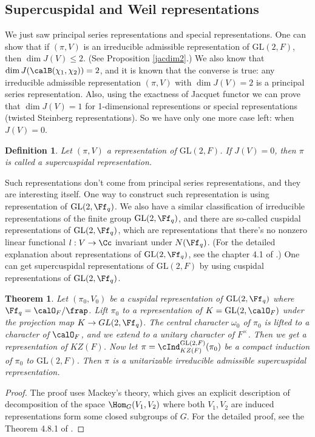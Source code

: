 \documentclass{article}
\newtheorem{theorem}{Theorem}[section]
\newtheorem{definition}{Definition}[section]
\newcommand{\GL}{\mathrm{GL}}
\begin{document}
\subsection{Supercuspidal and Weil representations}
We just saw principal series representations and special representations. One can show that if $(\pi, V)$  is an irreducible admissible representation of $\GL(2, F)$, then $\dim J(V) \leq 2$. (See Proposition \ref{jacdim2}.) 
We also know that $\dim J(\calB(\chi_1, \chi_2)) = 2$, and it is known that the converse is true: any irreducible admissible representation $(\pi, V)$ with $\dim J(V) = 2$ is a principal series representation. 
Also, using the exactness of Jacquet functor we can prove that $\dim J(V) = 1$ for 1-dimensional representions or special representations (twisted Steinberg representations).  
So we have only one more case left: when $J(V) = 0$. 
\begin{definition}
Let $(\pi, V)$ a representation of $\GL(2, F)$. If $J(V) = 0$, then $\pi$ is called a supercuspidal representation. 
\end{definition}

Such representations don't come from principal series representations, and they are interesting itself. 
One way to construct such representation is using representation of $\GL(2, \Ff_{q})$. 
We also have a similar classification of irreducible representations of the finite group $\GL(2, \Ff_{q})$, 
and there are so-called cuspidal representations of $\GL(2, \Ff_{q})$, which are representations that there's no nonzero linear functional $l:V\to \Cc$ invariant under $N(\Ff_{q})$.  (For the detailed explanation about representations of $\GL(2, \Ff_{q})$, see the chapter 4.1 of \cite{bu}.) 
One can get supercuspidal representations of $\GL(2, F)$ by using cuspidal representations of $\GL(2, \Ff_{q})$. 
\begin{theorem}
Let $(\pi_0, V_0)$ be a cuspidal representation of $\GL(2, \Ff_{q})$ where $\Ff_{q}= \calO_{F}/ \frap$. Lift $\pi_{0}$ to a representation of $K = \GL(2, \calO_{F})$ under the projection map $K \to GL(2, \Ff_{q})$. 
The central character $\omega_0$ of $\pi_{0}$ is lifted to a character of $\calO_{F}$, and we extend to a unitary character of $F^{\times}$. 
Then we get a representation of $KZ(F)$. Now let $\pi = \cInd_{KZ(F)}^{\GL(2, F)} (\pi_{0})$ be a compact induction of $\pi_0$ to $\GL(2, F)$. 
Then $\pi$ is a unitarizable irreducible admissible supercuspidal representation. 
\end{theorem}
\begin{proof}
The proof uses Mackey's theory, which gives an explicit description of decomposition of the space $\Hom_{G}(V_{1}, V_{2})$ where both $V_{1}, V_{2}$ are induced representations form some closed subgroups of $G$. For the detailed proof, see the Theorem 4.8.1 of \cite{bu}. 
\end{proof}
\end{document}
